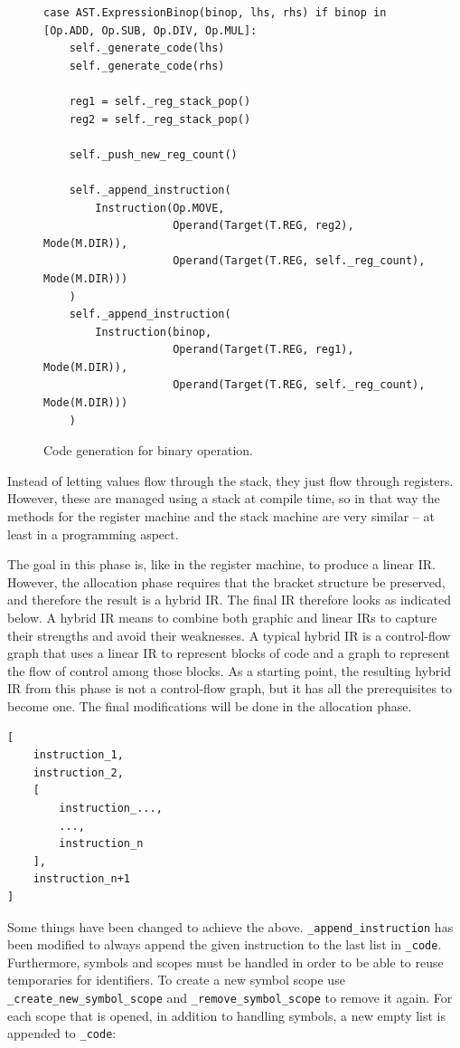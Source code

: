 \begin{figure}[H]
\begin{verbatim}
case AST.ExpressionBinop(binop, lhs, rhs) if binop in [Op.ADD, Op.SUB, Op.DIV, Op.MUL]:
    self._generate_code(lhs)
    self._generate_code(rhs)

    reg1 = self._reg_stack_pop()
    reg2 = self._reg_stack_pop()

    self._push_new_reg_count()

    self._append_instruction(
        Instruction(Op.MOVE,
                    Operand(Target(T.REG, reg2), Mode(M.DIR)),
                    Operand(Target(T.REG, self._reg_count), Mode(M.DIR)))
    )
    self._append_instruction(
        Instruction(binop,
                    Operand(Target(T.REG, reg1), Mode(M.DIR)),
                    Operand(Target(T.REG, self._reg_count), Mode(M.DIR)))
    )
\end{verbatim}
\caption{Code generation for binary operation.}
\label{fig:binop}
\end{figure}

Instead of letting values flow through the stack, they just flow through registers. However, these are managed using a stack at compile time, so in that way the methods for the register machine and the stack machine are very similar -- at least in a programming aspect.

The goal in this phase is, like in the register machine, to produce a linear IR. However, the allocation phase requires that the bracket structure be preserved, and therefore the result is a hybrid IR. The final IR therefore looks as indicated below. A hybrid IR means to combine both graphic and linear IRs to capture their strengths and avoid their weaknesses. A typical hybrid IR is a control-flow graph that uses a linear IR to represent blocks of code and a graph to represent the flow of control among those blocks. As a starting point, the resulting hybrid IR from this phase is not a control-flow graph, but it has all the prerequisites to become one. The final modifications will be done in the allocation phase.

\begin{verbatim}
[
    instruction_1,
    instruction_2,
    [
        instruction_...,
        ..., 
        instruction_n
    ],
    instruction_n+1
]
\end{verbatim}

Some things have been changed to achieve the above. \texttt{\_append\_instruction} has been modified to always append the given instruction to the last list in \texttt{\_code}. Furthermore, symbols and scopes must be handled in order to be able to reuse temporaries for identifiers. To create a new symbol scope use \texttt{\_create\_new\_symbol\_scope} and \texttt{\_remove\_symbol\_scope} to remove it again. For each scope that is opened, in addition to handling symbols, a new empty list is appended to \texttt{\_code}:

